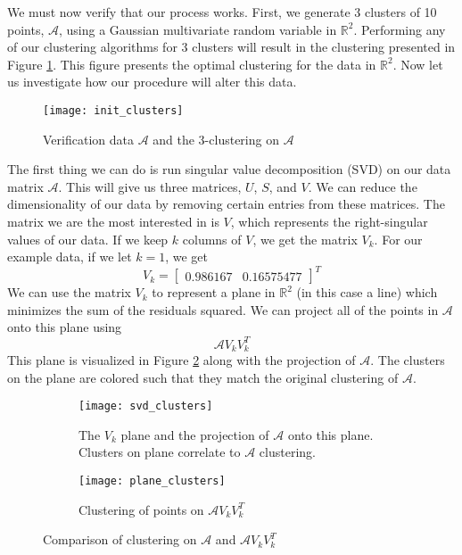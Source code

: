 \documentclass[a4paper, 11pt]{article} %
\begin{document}
We must now verify that our process works. First, we generate 3 clusters of 10 points, $\mathcal{A}$, using a Gaussian multivariate random variable in $\mathbb{R}^2$. Performing any of our clustering algorithms for 3 clusters will result in the clustering presented in Figure \ref{init_clusters}. This figure presents the optimal clustering for the data in $\mathbb{R}^2$. Now let us investigate how our procedure will alter this data. 
\begin{figure}[H]
\centering
\texttt{[image: init\_clusters]}
\caption{Verification data $\mathcal{A}$ and the 3-clustering on $\mathcal{A}$}
\label{init_clusters}
\end{figure}
The first thing we can do is run singular value decomposition (SVD) on our data matrix $\mathcal{A}$. This will give us three matrices, $U$, $S$, and $V$. We can reduce the dimensionality of our data by removing certain entries from these matrices. The matrix we are the most interested in is $V$, which represents the right-singular values of our data. If we keep $k$ columns of $V$, we get the matrix $V_k$. For our example data, if we let $k = 1$, we get 
$$V_k = \begin{bmatrix}
0.986167 & 0.16575477
\end{bmatrix}^T$$
We can use the matrix $V_k$ to represent a plane in $\mathbb{R}^2$ (in this case a line) which minimizes the sum of the residuals squared. We can project all of the points in $\mathcal{A}$ onto this plane using
$$\mathcal{A}V_kV_k^T$$
This plane is visualized in Figure \ref{svd_clusters} along with the projection of $\mathcal{A}$. The clusters on the plane are colored such that they match the original clustering of $\mathcal{A}$. 

\begin{figure}[H]
\centering
\begin{subfigure}{.5\textwidth}
  \centering
  \texttt{[image: svd\_clusters]}
  \caption{The $V_k$ plane and the projection of $\mathcal{A}$ onto this plane. Clusters on plane correlate to $\mathcal{A}$ clustering.}
  \label{svd_clusters}
\end{subfigure}%
\begin{subfigure}{.5\textwidth}
  \centering
  \texttt{[image: plane\_clusters]}
  \caption{Clustering of points on $\mathcal{A}V_kV_k^T$}
  \label{plane_clusters}
\end{subfigure}
\caption{Comparison of clustering on $\mathcal{A}$ and $\mathcal{A}V_kV_k^T$}
\label{fig:test}
\end{figure}
\end{document}
